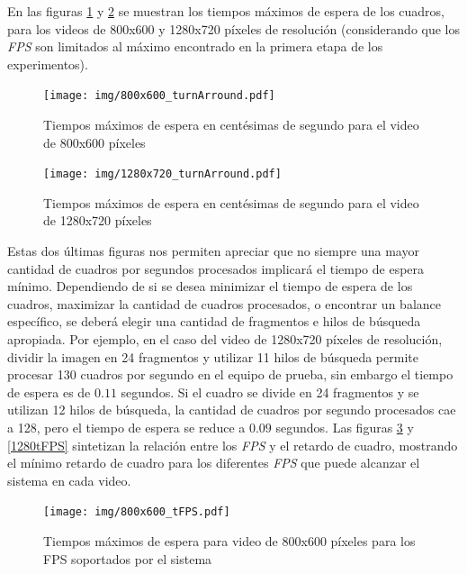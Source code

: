 En las figuras \ref{800turnArround} y \ref{1280turnArround} se muestran los
tiempos máximos de espera de los cuadros, para los videos de 800x600 y 1280x720
píxeles de resolución (considerando que los \emph{FPS} son limitados al máximo
encontrado en la primera etapa de los experimentos).

\begin{figure}[!htb]

	\texttt{[image: img/800x600\_turnArround.pdf]}
	\caption{Tiempos máximos de espera en centésimas de segundo para el
	video de 800x600 píxeles}
	\label{800turnArround}

\end{figure}


\begin{figure}[!htb]

	\texttt{[image: img/1280x720\_turnArround.pdf]}
	\caption{Tiempos máximos de espera en centésimas de segundo para el
	video de 1280x720 píxeles}
	\label{1280turnArround}

\end{figure}

Estas dos últimas figuras nos permiten apreciar que no siempre una mayor
cantidad de cuadros por segundos procesados implicará el tiempo de espera
mínimo. Dependiendo de si se desea minimizar el tiempo de espera de los cuadros,
maximizar la cantidad de cuadros procesados, o encontrar un balance específico,
se deberá elegir una cantidad de fragmentos e hilos de búsqueda apropiada. Por
ejemplo, en el caso del video de 1280x720 píxeles de resolución, dividir la
imagen en 24 fragmentos y utilizar 11 hilos de búsqueda permite procesar 130
cuadros por segundo en el equipo de prueba, sin embargo el tiempo de espera es
de $0.11$ segundos. Si el cuadro se divide en 24 fragmentos y se utilizan 12
hilos de búsqueda, la cantidad de cuadros por segundo procesados cae a 128, pero
el tiempo de espera se reduce a $0.09$ segundos. Las figuras \ref{800tFPS} y
\ref{1280tFPS} sintetizan la relación entre los \emph{FPS} y el retardo de
cuadro, mostrando el mínimo retardo de cuadro para los diferentes \emph{FPS}
que puede alcanzar el sistema en cada video.

\begin{figure}[!htb]

	\texttt{[image: img/800x600\_tFPS.pdf]}
	\caption{Tiempos máximos de espera para video de 800x600 píxeles para
	los FPS soportados por el sistema}
	\label{800tFPS}

\end{figure}


